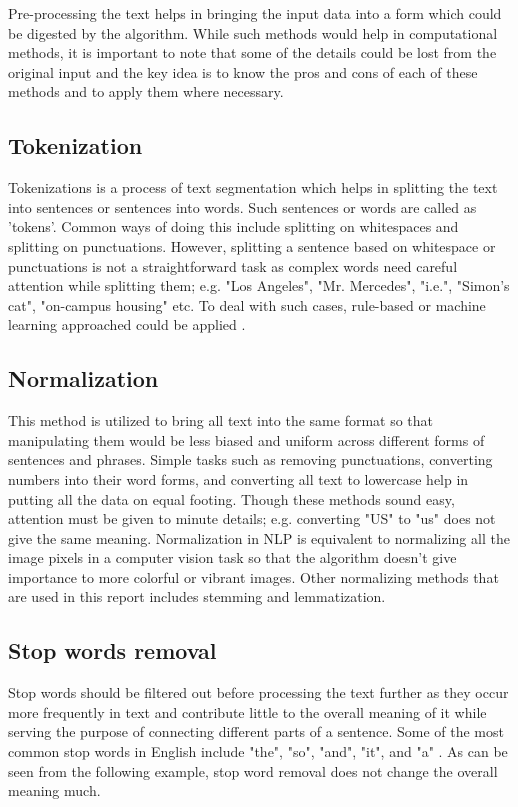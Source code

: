 Pre-processing the text helps in bringing the input data into a form which could be digested by the algorithm. While such methods would help in computational methods, it is important to note that some of the details could be lost from the original input and the key idea is to know the pros and cons of each of these methods and to apply them where necessary.

\subsection{Tokenization}

Tokenizations is a process of text segmentation which helps in splitting the text into sentences or sentences into words. Such sentences or words are called as 'tokens'. Common ways of doing this include splitting on whitespaces and splitting on punctuations. However, splitting a sentence based on whitespace or punctuations is not a straightforward task as complex words need careful attention while splitting them; e.g. "Los Angeles", "Mr. Mercedes", "i.e.", "Simon's cat", "on-campus housing" etc. To deal with such cases, rule-based or machine learning approached could be applied \cite{jurafsky2014speech}.

\subsection{Normalization}

This method is utilized to bring all text into the same format so that manipulating them would be less biased and uniform across different forms of sentences and phrases. Simple tasks such as removing punctuations, converting numbers into their word forms, and converting all text to lowercase help in putting all the data on equal footing. Though these methods sound easy, attention must be given to minute details; e.g. converting "US" to "us" does not give the same meaning. Normalization in NLP is equivalent to normalizing all the image pixels in a computer vision task so that the algorithm doesn't give importance to more colorful or vibrant images. Other normalizing methods that are used in this report includes stemming and lemmatization. 

\subsection{Stop words removal} 

Stop words should be filtered out before processing the text further as they occur more frequently in text and contribute little to the overall meaning of it while serving the purpose of connecting different parts of a sentence. Some of the most common stop words in English include "the", "so", "and", "it", and "a" \cite{nltk_list}. As can be seen from the following example, stop word removal does not change the overall meaning much. 

